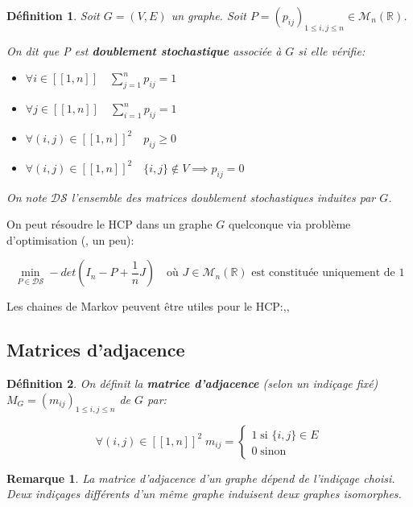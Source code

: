 \documentclass[french,a4paper]{article}
\newtheorem{definition}{Définition}[section]
\newtheorem{remark}{Remarque}[section]
\begin{document}
\begin{definition}
Soit $G=(V,E)$ un graphe.
Soit $P={(p_{ij})}_{1 \le i,j \le n} \in \mathcal{M}_{n}(\mathbb{R})$.

On dit que P est \textbf{doublement stochastique} associée à $G$ si elle vérifie:

\begin{itemize}
\item $\forall i \in [\![1,n]\!] \quad \sum\limits_{j=1}^{n}p_{ij}=1$
\item  $\forall j \in [\![1,n]\!] \quad \sum\limits_{i=1}^{n}p_{ij}=1$
\item $\forall (i,j) \in {[\![1,n]\!]}^{2} \quad p_{ij} \ge 0$
\item  $\forall (i,j) \in {[\![1,n]\!]}^{2} \quad \{i,j\} \notin V \implies p_{ij}=0$
\end{itemize}

On note $\mathcal{D}\mathcal{S}$ l'ensemble des matrices doublement stochastiques induites par $G$.
\end{definition}

On peut résoudre le HCP dans un graphe $G$ quelconque via problème d'optimisation (\cite{Haythorpe2010FindingHC,Ejov2008DeterminantsAL}, un peu\cite{Ejov2009ConsistentBO}):

\[
\min_{P \in \mathcal{D}\mathcal{S}} -det(I_{n}-P+\frac{1}{n}J) \quad \text{où $J \in \mathcal{M}_{n}(\mathbb{R})$ est constituée uniquement de 1}
\]

Les chaines de Markov peuvent être utiles pour le HCP:\cite{Haythorpe2013MarkovCB},\cite{Ejov2009ConsistentBO},\cite{Filar2007ControlledMC}

\subsection{Matrices d'adjacence}

\begin{definition}
On définit la \textbf{matrice d'adjacence} (selon un indiçage fixé) $M_G=(m_{ij})_{1 \le i,j \le n}$ de $G$ par:

\[
\forall (i,j) \in [\![1,n]\!]^2 \; m_{ij}=
	\begin{cases}
	1 \; \text{si $\{i,j\} \in E$}\\
	0 \; \text{sinon}
	\end{cases}
\]
\end{definition}

\begin{remark}
La matrice d'adjacence d'un graphe dépend de l'indiçage choisi. Deux indiçages différents d'un même graphe induisent deux graphes isomorphes.
\end{remark}
\end{document}
